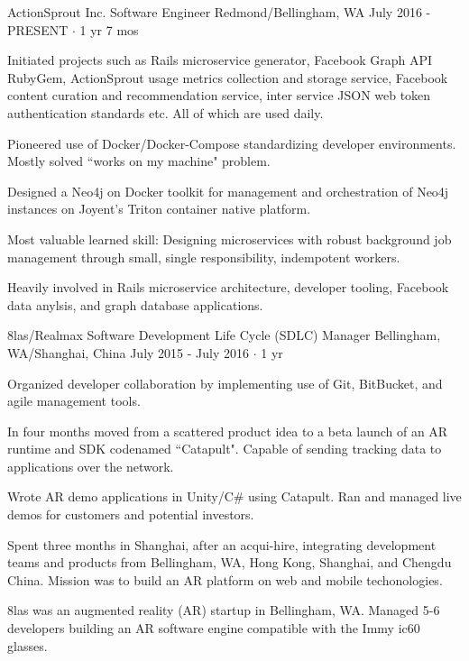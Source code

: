 \documentclass[11pt, a4paper]{awesome-cv}
\begin{document}
\begin{cventries}
  \cventry
    {ActionSprout Inc.} %
    {Software Engineer} %
    {Redmond/Bellingham, WA} %
    {July 2016 - PRESENT $\cdot$ 1 yr 7 mos} %
    {
      \begin{cvitems} %
        \item Initiated projects such as Rails microservice generator, Facebook Graph API RubyGem, ActionSprout usage metrics collection and storage service, Facebook content curation and recommendation service, inter service JSON web token authentication standards etc. All of which are used daily.
        \item Pioneered use of Docker/Docker-Compose standardizing developer environments. Mostly solved ``works on my machine" problem.
        \item Designed a Neo4j on Docker toolkit for management and orchestration of Neo4j instances on Joyent's Triton container native platform.
        \item Most valuable learned skill: Designing microservices with robust background job management through small, single responsibility, indempotent workers.
      \end{cvitems}
    }
    {
      Heavily involved in Rails microservice architecture, developer tooling, Facebook data anylsis, and graph database applications.
    }

  \cventry
    {8las/Realmax} %
    {Software Development Life Cycle (SDLC) Manager} %
    {Bellingham, WA/Shanghai, China} %
    {July 2015 - July 2016 $\cdot$ 1 yr} %
    {
      \begin{cvitems} %
        \item Organized developer collaboration by implementing use of Git, BitBucket, and agile management tools.
        \item In four months moved from a scattered product idea to a beta launch of an AR runtime and SDK codenamed ``Catapult". Capable of sending tracking data to applications over the network.
        \item Wrote AR demo applications in Unity/C\# using Catapult. Ran and managed live demos for customers and potential investors.
        \item Spent three months in Shanghai, after an acqui-hire, integrating development teams and products from Bellingham, WA, Hong Kong, Shanghai, and Chengdu China. Mission was to build an AR platform on web and mobile techonologies.
      \end{cvitems}
    }
    {
      8las was an augmented reality (AR) startup in Bellingham, WA. Managed 5-6 developers building an AR software engine compatible with the Immy ic60 glasses.
    }


\end{cventries}
\end{document}
